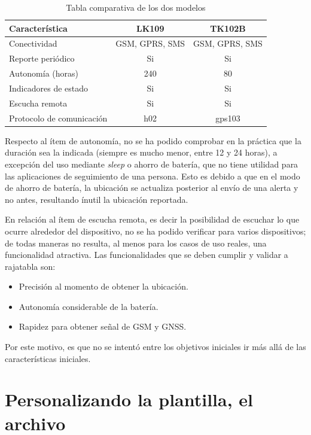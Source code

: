 \begin{table}[h]
	\centering
	\caption[Tabla comparativa]{Tabla comparativa de los dos modelos}
	\begin{tabular}{l c c}    
		\toprule
		\textbf{Característica} 	 & \textbf{LK109} & \textbf{TK102B}	  \\
		\midrule
		Conectividad & GSM, GPRS, SMS & 	GSM, GPRS, SMS			\\		
		Reporte periódico & Si & Si			\\
		Autonomía (horas) & 240 & 80		\\
		Indicadores de estado & Si & Si \\
		Escucha remota & Si & Si \\
		Protocolo de comunicación & h02 & gps103 \\
		\bottomrule
		\hline
	\end{tabular}
	\label{tab:peces}
\end{table}

Respecto al ítem de autonomía, no se ha podido comprobar en la práctica que la duración sea la indicada (siempre es mucho menor, entre 12 y 24 horas), a excepción del uso mediante \textit{sleep} o ahorro de batería, que no tiene utilidad para las aplicaciones de seguimiento de una persona. Esto es debido a que en el modo de ahorro de batería, la ubicación se actualiza posterior al envío de una alerta y no antes, resultando ínutil la ubicación reportada.

En relación al ítem de escucha remota, es decir la posibilidad de escuchar lo que ocurre alrededor del dispositivo, no se ha podido verificar para varios dispositivos; de todas maneras no resulta, al menos para los casos de uso reales, una funcionalidad atractiva. Las funcionalidades que se deben cumplir y validar a rajatabla son:
\begin{itemize}
	\item Precisión al momento de obtener la ubicación.
	\item Autonomía considerable de la batería.
	\item Rapidez para obtener señal de GSM y GNSS.
\end{itemize}

Por este motivo, es que no se intentó entre los objetivos iniciales ir más allá de las características iniciales.

\section{Personalizando la plantilla, el archivo }
\label{sec:FillingFile}

